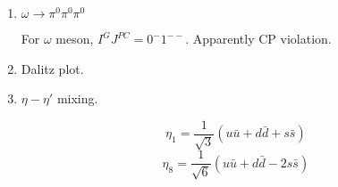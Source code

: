 \documentclass{article}
\begin{document}
\begin{enumerate}
	  \item $\omega\rightarrow\pi^0\pi^0\pi^0$

		For $\omega$ meson, $I^GJ^{PC}=0^-1^{--}$. Apparently CP violation.

    \item Dalitz plot.


    \item $\eta-\eta'$ mixing.

    $$\eta_1=\frac{1}{\sqrt{3}}(u\bar u+d\bar d+s\bar s)$$
    $$\eta_8=\frac{1}{\sqrt{6}}(u\bar u+d\bar d-2s\bar s)$$
\end{enumerate}
\end{document}
